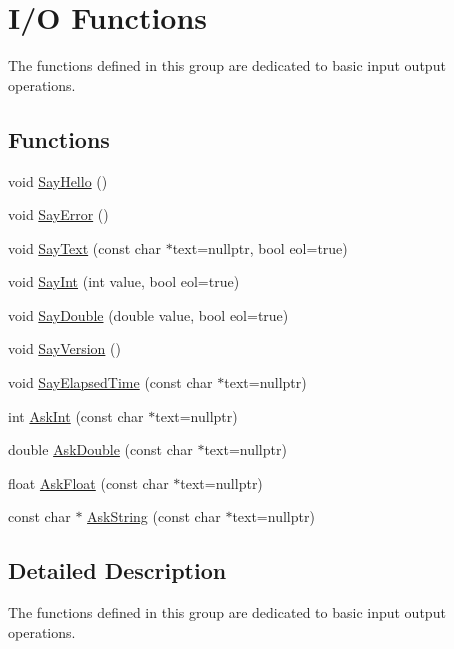 \hypertarget{group__io__group}{}\section{I/O Functions}
\label{group__io__group}


The functions defined in this group are dedicated to basic input output operations.  


\subsection*{Functions}
\begin{DoxyCompactItemize}
\item 
void \hyperlink{group__io__group_ga43fd6e7b7a627ba82ff93795559479f8}{Say\+Hello} ()
\item 
void \hyperlink{group__io__group_gaa8fd8044fbf35d58e73087b6399cd82a}{Say\+Error} ()
\item 
void \hyperlink{group__io__group_ga82cdf45375c3b92b2a60c3d9b55d682f}{Say\+Text} (const char $\ast$text=nullptr, bool eol=true)
\item 
void \hyperlink{group__io__group_gaa78da65e44d9ab5e70c79ed77f62b86a}{Say\+Int} (int value, bool eol=true)
\item 
void \hyperlink{group__io__group_ga6af59270fa536fa4c3e9f8434a8fb4a0}{Say\+Double} (double value, bool eol=true)
\item 
void \hyperlink{group__io__group_gaccd19a10653fad0734fe384cd6d7ba53}{Say\+Version} ()
\item 
void \hyperlink{group__io__group_ga9988545ab3fddd93e05654323cdb1f4b}{Say\+Elapsed\+Time} (const char $\ast$text=nullptr)
\item 
int \hyperlink{group__io__group_gae3d41902eb45488b04016096918d605c}{Ask\+Int} (const char $\ast$text=nullptr)
\item 
double \hyperlink{group__io__group_ga2ecfe90c9b28dec6725b8df1a0013d0d}{Ask\+Double} (const char $\ast$text=nullptr)
\item 
float \hyperlink{group__io__group_ga973515b754711fc89a018ce64f980c74}{Ask\+Float} (const char $\ast$text=nullptr)
\item 
const char $\ast$ \hyperlink{group__io__group_ga89af41351370788f6b9d33fd0bd89d91}{Ask\+String} (const char $\ast$text=nullptr)
\end{DoxyCompactItemize}


\subsection{Detailed Description}
The functions defined in this group are dedicated to basic input output operations. 



